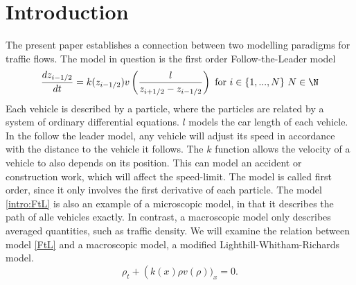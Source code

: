 \chapter{Introduction}

\iffalse
why its called follow the leader. 
Disposisjon.
	- There are different ways to approach the micro-macro limit
	- On the different philosophies
	- Different levels of mathematical complexity, distinct description for different phenomenon.

On the background in traffic modelling
Problemstilling: 
\fi
The present paper establishes a connection between two modelling paradigms for traffic flows. The model in question is the  first order Follow-the-Leader model  
\begin{equation} \label{intro:FtL}
	 \frac{dz_{i-1/2}}{dt} = k(z_{i-1/2})v\left(\frac{l}{z_{i+1/2} - z_{i-1/2}}\right) \text{ for } i \in \{1,...,N\} \,\, N \in \N
\end{equation}
Each vehicle is described by a particle, where the particles are related by a system of ordinary differential equations. $l$ models the car length of each vehicle. In the follow the leader model, any vehicle will adjust its speed in accordance with the distance to the vehicle it follows. The $k$ function allows the velocity of a vehicle to also depends on its position. This can model an accident or construction work, which will affect the speed-limit. The model is called first order, since it only involves the first derivative of each particle. The model \eqref{intro:FtL} is also an example of a microscopic model, in that it describes the path of alle vehicles exactly. In contrast, 
a macroscopic model only describes averaged quantities, such as  traffic density. We will examine the relation between model \eqref{FtL} and a macroscopic model, a modified Lighthill-Whitham-Richards model.  
\begin{equation} \label{intro:LWR}
	\rho_t + \left(k(x)\rho v\left(\rho\right))_x = 0.
\end{equation}

